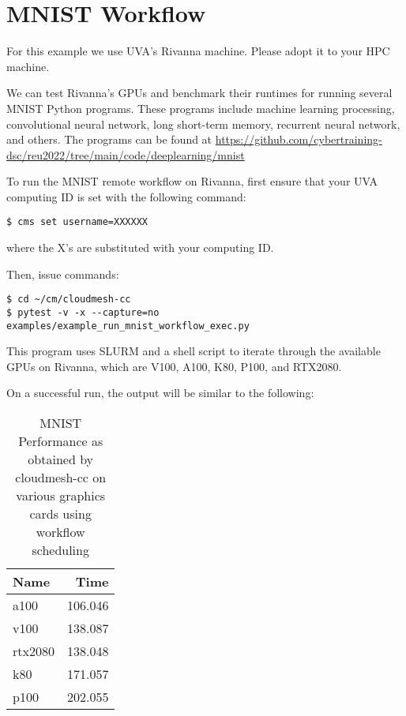 
\section{MNIST Workflow}\label{mnist-workflow}

For this example we use UVA's Rivanna machine. Please adopt it to your
HPC machine.

We can test Rivanna's GPUs and benchmark their runtimes for running
several MNIST Python programs. These programs include machine learning
processing, convolutional neural network, long short-term memory,
recurrent neural network, and others. The programs can be found at
\url{https://github.com/cybertraining-dsc/reu2022/tree/main/code/deeplearning/mnist}

To run the MNIST remote workflow on Rivanna, first ensure that your UVA
computing ID is set with the following command:

\bigbreak
\begin{verbatim}
$ cms set username=XXXXXX
\end{verbatim}
\bigbreak

where the X's are substituted with your computing ID.

Then, issue commands:

\bigbreak
\begin{verbatim}
$ cd ~/cm/cloudmesh-cc
$ pytest -v -x --capture=no examples/example_run_mnist_workflow_exec.py
\end{verbatim}
\bigbreak

This program uses SLURM and a shell script to iterate through the
available GPUs on Rivanna, which are V100, A100, K80, P100, and RTX2080.

On a successful run, the output will be similar to the following:

\begin{table}[!ht]
\caption{MNIST Performance as obtained by cloudmesh-cc on various graphics cards using workflow scheduling}
    \centering
    \begin{tabular}{lr}
    \hline
        Name & Time \\ \hline
        a100 & 106.046 \\ 
        v100 & 138.087 \\ 
        rtx2080 & 138.048 \\
        k80 & 171.057 \\ 
        p100 & 202.055 \\
    \end{tabular}
    \label{table:mnist-times}
  \end{table}
  
